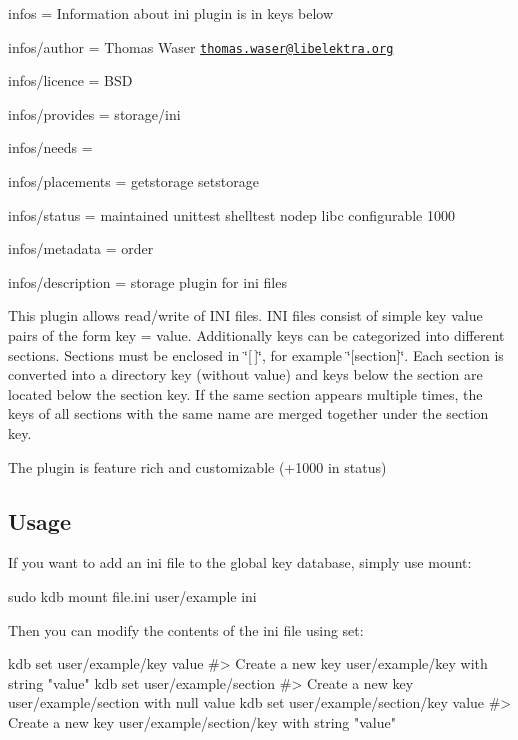 
\begin{DoxyItemize}
\item infos = Information about ini plugin is in keys below
\item infos/author = Thomas Waser \href{mailto:thomas.waser@libelektra.org}{\tt thomas.\+waser@libelektra.\+org}
\item infos/licence = B\+SD
\item infos/provides = storage/ini
\item infos/needs =
\item infos/placements = getstorage setstorage
\item infos/status = maintained unittest shelltest nodep libc configurable 1000
\item infos/metadata = order
\item infos/description = storage plugin for ini files
\end{DoxyItemize}

This plugin allows read/write of I\+NI files. I\+NI files consist of simple key value pairs of the form {\ttfamily key = value}. Additionally keys can be categorized into different sections. Sections must be enclosed in \char`\"{}\mbox{[}$\,$\mbox{]}\char`\"{}, for example \char`\"{}\mbox{[}section\mbox{]}\char`\"{}. Each section is converted into a directory key (without value) and keys below the section are located below the section key. If the same section appears multiple times, the keys of all sections with the same name are merged together under the section key.

The plugin is feature rich and customizable (+1000 in status)

\subsection*{Usage}

If you want to add an ini file to the global key database, simply use mount\+:


\begin{DoxyCode}
sudo kdb mount file.ini user/example ini
\end{DoxyCode}


Then you can modify the contents of the ini file using set\+:


\begin{DoxyCode}
kdb set user/example/key value
#> Create a new key user/example/key with string "value"
kdb set user/example/section
#> Create a new key user/example/section with null value
kdb set user/example/section/key value
#> Create a new key user/example/section/key with string "value"
\end{DoxyCode}


